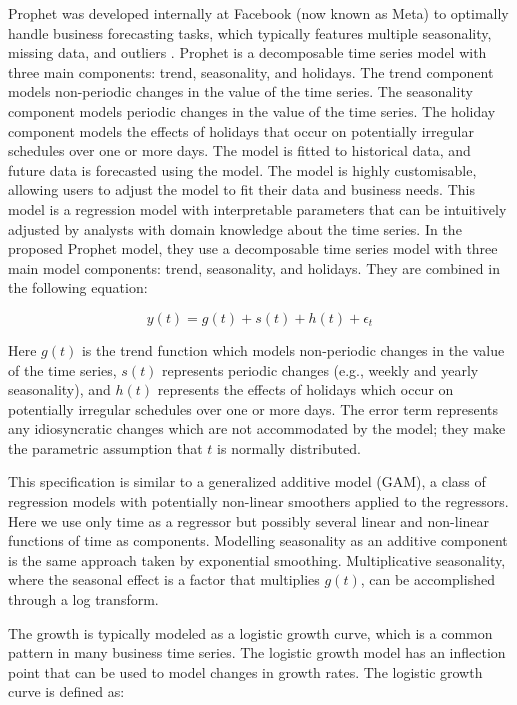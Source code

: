 \documentclass[mstat,12pt]{unswthesis}
\begin{document}
Prophet was developed internally at Facebook (now known as Meta) to
optimally handle business forecasting tasks, which typically features
multiple seasonality, missing data, and outliers
\cite{taylor2017facebook}. Prophet is a decomposable time series model
with three main components: trend, seasonality, and holidays. The trend
component models non-periodic changes in the value of the time series.
The seasonality component models periodic changes in the value of the
time series. The holiday component models the effects of holidays that
occur on potentially irregular schedules over one or more days. The
model is fitted to historical data, and future data is forecasted using
the model. The model is highly customisable, allowing users to adjust
the model to fit their data and business needs. This model is a
regression model with interpretable parameters that can be intuitively
adjusted by analysts with domain knowledge about the time series. In the
proposed Prophet model, they use a decomposable time series model with
three main model components: trend, seasonality, and holidays. They are
combined in the following equation:

\[
y(t) = g(t) + s(t) + h(t) + \epsilon_t
\]

Here \(g(t)\) is the trend function which models non-periodic changes in
the value of the time series, \(s(t)\) represents periodic changes
(e.g., weekly and yearly seasonality), and \(h(t)\) represents the
effects of holidays which occur on potentially irregular schedules over
one or more days. The error term represents any idiosyncratic changes
which are not accommodated by the model; they make the parametric
assumption that \(t\) is normally distributed.

This specification is similar to a generalized additive model (GAM), a
class of regression models with potentially non-linear smoothers applied
to the regressors. Here we use only time as a regressor but possibly
several linear and non-linear functions of time as components. Modelling
seasonality as an additive component is the same approach taken by
exponential smoothing. Multiplicative seasonality, where the seasonal
effect is a factor that multiplies \(g(t)\), can be accomplished through
a log transform.

The growth is typically modeled as a logistic growth curve, which is a
common pattern in many business time series. The logistic growth model
has an inflection point that can be used to model changes in growth
rates. The logistic growth curve is defined as:
\end{document}
